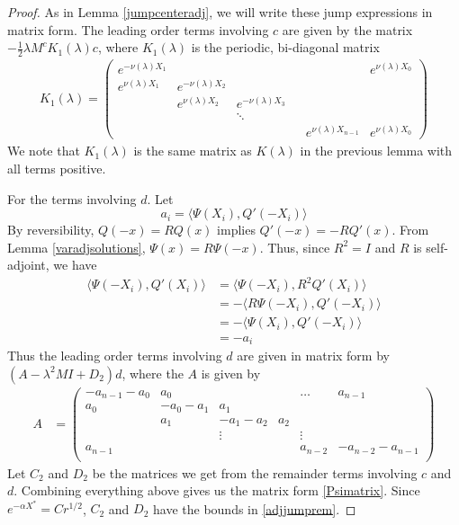 \documentclass[thesis.tex]{subfiles}
\begin{document}
\begin{lemma}
\begin{proof}
As in Lemma \ref{jumpcenteradj}, we will write these jump expressions in matrix form. The leading order terms involving $c$ are given by the matrix $-\frac{1}{2}\lambda M^c K_1(\lambda)c$, where $K_1(\lambda)$ is the periodic, bi-diagonal matrix
\begin{align*}
K_1(\lambda) =  
\begin{pmatrix}
e^{-\nu(\lambda)X_1} & & & & & e^{\nu(\lambda)X_0} \\
e^{\nu(\lambda)X_1} & e^{-\nu(\lambda)X_2} \\
& e^{\nu(\lambda)X_2} & e^{-\nu(\lambda)X_3} \\
 & & \ddots & &&   \\
& & & & e^{\nu(\lambda)X_{n-1}} & e^{\nu(\lambda)X_0}
\end{pmatrix}
\end{align*}
We note that $K_1(\lambda)$ is the same matrix as $K(\lambda)$ in the previous lemma with all terms positive.

For the terms involving $d$. Let
\[
a_i = \langle \Psi(X_i), Q'(-X_i) \rangle 
\]
By reversibility, $Q(-x) = R Q(x)$ implies $Q'(-x) = -R Q'(x)$. From Lemma \ref{varadjsolutions}, $\Psi(x) = R \Psi(-x)$. Thus, since $R^2 = I$ and $R$ is self-adjoint, we have
\begin{align*}
\langle \Psi(-X_i), Q'(X_i) \rangle &= \langle \Psi(-X_i), R^2 Q'(X_i) \rangle \\
&= -\langle R \Psi(-X_i), Q'(-X_i) \rangle \\
&= -\langle \Psi(X_i), Q'(-X_i) \rangle \\
&= -a_i
\end{align*}
Thus the leading order terms involving $d$ are given in matrix form by $(A - \lambda^2 M I + D_2)d$, where the $A$ is given by
\begin{align*}
A &= \begin{pmatrix}
-a_{n-1} - a_0 & a_0 & & & \dots & a_{n-1}\\
a_0 & -a_0 - a_1 &  a_1 \\
& a_1 & -a_1 - a_2 &  a_2 \\
& & \vdots & & \vdots \\
a_{n-1} & & & & a_{n-2} & -a_{n-2} - a_{n-1} \\
\end{pmatrix}
\end{align*}
Let $C_2$ and $D_2$ be the matrices we get from the remainder terms involving $c$ and $d$. Combining everything above gives us the matrix form \cref{Psimatrix}. Since $e^{-\alpha X^*} = C r^{1/2}$, $C_2$ and $D_2$ have the bounds in \cref{adjjumprem}.
\end{proof}
\end{lemma}
\end{document}
